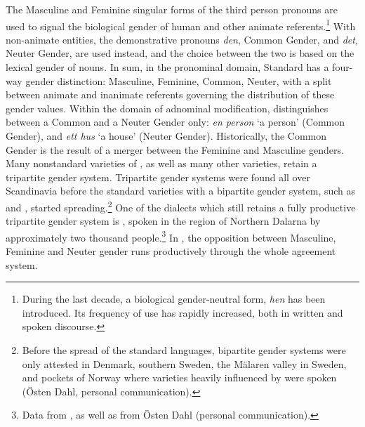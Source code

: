 \documentclass[output=collectionpaper]{langsci/langscibook}
\begin{document}
The Masculine and Feminine singular forms of the third person pronouns are used to signal the biological gender of human and other animate referents.\footnote{During the last decade, a biological gender-neutral form, \textit{hen} has been introduced. Its frequency of use has rapidly increased, both in written and spoken  discourse.} With non-animate entities, the demonstrative pronouns \textit{den}, Common Gender, and \textit{det}, Neuter Gender, are used instead, and the choice between the two is based on the lexical gender of nouns. In sum, in the pronominal domain, Standard  has a four-way gender distinction: Masculine, Feminine, Common, Neuter, with a split between animate and inanimate referents governing the distribution of these gender values.  Within the domain of adnominal modification,  distinguishes between a Common and a Neuter Gender only: \textit{en person} `a person' (Common Gender), and \textit{ett hus} `a house' (Neuter Gender). Historically, the Common Gender is the result of a merger between the Feminine and Masculine genders. Many nonstandard varieties of , as well as many other  varieties, retain a tripartite gender system. Tripartite gender systems were found all over Scandinavia before the standard varieties with a bipartite gender system, such as  and , started spreading.\footnote{Before the spread of the standard languages, bipartite gender systems were only attested in Denmark, southern Sweden, the M\"alaren valley in Sweden, and pockets of Norway where varieties heavily influenced by  were spoken (\"Osten Dahl, personal communication).} One of the  dialects which still retains a fully productive tripartite gender system is , spoken in the  region of Northern Dalarna by approximately two thousand people.\footnote{Data from \citet{AAkerberg2012}, as well as from Östen Dahl (personal communication).} In , the opposition between Masculine, Feminine and Neuter gender runs productively through the whole agreement system.
\end{document}

